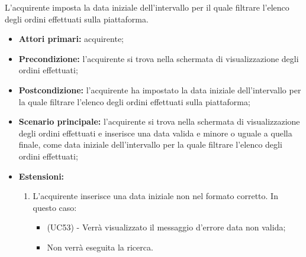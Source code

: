 L'acquirente imposta la data iniziale dell'intervallo per il quale filtrare l'elenco degli ordini effettuati sulla piattaforma.
\begin{itemize}
    \item \textbf{Attori primari:} acquirente;
    \item \textbf{Precondizione:} l'acquirente si trova nella schermata di visualizzazione degli ordini effettuati;
    \item \textbf{Postcondizione:} l'acquirente ha impostato la data iniziale dell'intervallo per la quale filtrare l'elenco degli ordini effettuati sulla piattaforma;
    \item \textbf{Scenario principale:} l'acquirente si trova nella schermata di visualizzazione degli ordini effettuati e inserisce una data valida e minore o uguale a quella finale, come data iniziale dell'intervallo per la quale filtrare l'elenco degli ordini effettuati;
    \item \textbf{Estensioni:}
    \begin{enumerate}[label=\lett]
        \item L'acquirente inserisce una data iniziale non nel formato corretto. In questo caso:
        \begin{itemize}
            \item (UC53) - Verrà visualizzato il messaggio d'errore data non valida;
            \item Non verrà eseguita la ricerca.
        \end{itemize} 
    \end{enumerate}
\end{itemize}

